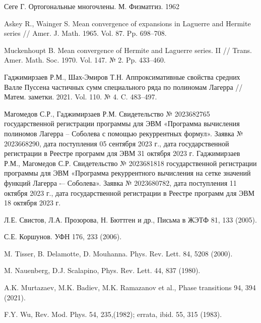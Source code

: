 \begin{thebibliography}{111}
{Сеге Г.} Ортогональные многочлены. М. Физматгиз. 1962

{Askey R., Wainger S.} Mean convergence of expansions in Laguerre and Hermite series // Amer. J. Math. 1965. Vol. 87. Pp. 698--708.

{Muckenhoupt B.} Mean convergence of Hermite and Laguerre series. II // Trans. Amer. Math. Soc. 1970. Vol. 147. № 2. Pp. 433--460.

{Гаджимирзаев Р.М., Шах-Эмиров Т.Н.} Аппроксимативные свойства средних Валле Пуссена частичных сумм специального ряда по полиномам Лагерра //
Матем. заметки. 2021. Vol. 110. № 4. C. 483--497.												

{Магомедов С.Р., Гаджимирзаев Р.М.} Свидетельство № 2023682765 государственной регистрации программы для ЭВМ «Программа вычисления полиномов Лагерра -- Соболева с помощью рекуррентных формул». Заявка № 2023668290, дата поступления 05 сентября 2023 г., дата государственной регистрации в Реестре программ для ЭВМ 31 октября 2023 г.
{Гаджимирзаев Р.М., Магомедов С.Р.} Свидетельство № 2023681818 государственной регистрации программы для ЭВМ «Программа рекуррентного вычисления на сетке значений функций Лагерра -– Соболева». Заявка № 2023680782, дата поступления 11 октября 2023 г., дата государственной регистрации в Реестре программ для ЭВМ 18 октября 2023 г.


Л.Е. Свистов, Л.А. Прозорова, Н. Бюттген и др., Письма в ЖЭТФ 81, 133 (2005).

С.Е. Коршунов. УФН 176, 233 (2006).

M. Tisser, B. Delamotte, D. Mouhanna. Phys. Rev. Lett. 84, 5208 (2000).

M. Nauenberg, D.J. Scalapino, Phys. Rev. Lett. 44, 837 (1980).

A.K. Murtazaev, M.K. Badiev, M.K. Ramazanov et al., Phase transitions 94, 394 (2021).

F.Y. Wu, Rev. Mod. Phys. 54, 235,(1982); errata, ibid. 55, 315 (1983).





\end{thebibliography} 